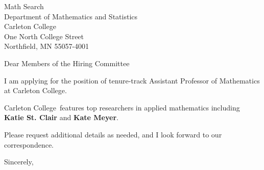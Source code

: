 




	
	
	\def\School{Carleton College}
	
	\begin{letter}
		{Math Search\\
			Department of Mathematics and Statistics\\
			Carleton College\\
			One North College Street\\
			Northfield, MN 55057-4001
		}
		
		\opening{Dear Members of the Hiring Committee}
		
		
		I am applying for the position of tenure-track Assistant Professor of Mathematics at \School. 
		
		
		
		\School~features top researchers in applied mathematics including \textbf{Katie St. Clair} and \textbf{Kate Meyer}. 
		
		
		
		
		
		Please request additional details as needed, and I look forward to our correspondence.
		
		\closing{Sincerely,}
	\end{letter}
